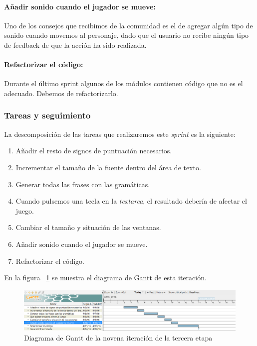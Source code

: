 \paragraph{Añadir sonido cuando el jugador se mueve:} Uno de los consejos que recibimos de la comunidad es el de agregar algún tipo de sonido cuando movemos al personaje, dado que el usuario no recibe ningún tipo de feedback de que la acción ha sido realizada.

\paragraph{Refactorizar el código:} Durante el último sprint algunos de los módulos contienen código que no es el adecuado. Debemos de refactorizarlo.

\subsubsection{Tareas y seguimiento}

La descomposición de las tareas que realizaremos este \textit{sprint} es la siguiente:

\begin{enumerate}[label=\bfseries WBS 9.\arabic*]
  \item Añadir el resto de signos de puntuación necesarios.
  \item Incrementar el tamaño de la fuente dentro del área de texto.
  \item Generar todas las frases con las gramáticas.
  \item Cuando pulsemos una tecla en la \textit{textarea}, el resultado debería de afectar el juego.
  \item Cambiar el tamaño y situación de las ventanas.
  \item Añadir sonido cuando el jugador se mueve.
  \item Refactorizar el código.
\end{enumerate}

En la figura ~\ref{fig:sec3it9} se muestra el diagrama de Gantt de esta iteración.

\begin{figure}
    \includegraphics[width=\textwidth,height=\textheight,keepaspectratio]{./img/sec3it9.png}
  \caption{Diagrama de Gantt de la novena iteración de la tercera etapa}
  \label{fig:sec3it9}
\end{figure}


